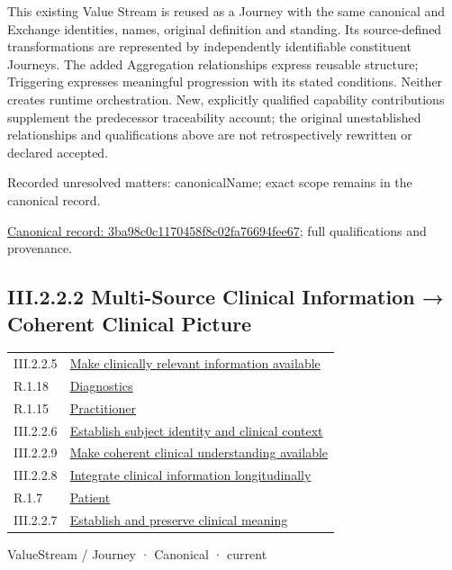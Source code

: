 This existing Value Stream is reused as a Journey with the same canonical and Exchange identities, names, original definition and standing. Its source-defined transformations are represented by independently identifiable constituent Journeys. The added Aggregation relationships express reusable structure; Triggering expresses meaningful progression with its stated conditions. Neither creates runtime orchestration. New, explicitly qualified capability contributions supplement the predecessor traceability account; the original unestablished relationships and qualifications above are not retrospectively rewritten or declared accepted.


{\small Recorded unresolved matters: canonicalName; exact scope remains in the canonical record.}\par
{\footnotesize \href{../../../../continuum/strategy/value-stream/3ba98c0c1170458f8c02fa76694fee67.md}{Canonical record: 3ba98c0c1170458f8c02fa76694fee67}; full qualifications and provenance.}\par
\subsection*{III.2.2.2 Multi-Source Clinical Information → Coherent Clinical Picture}
\label{navigation:III.2.2.2}

\begin{longtable}{p{.22\linewidth}p{.73\linewidth}}
III.2.2.5 & \hyperref[element:2e20e48451b64dafa4fe7eaee2501c7a]{Make clinically relevant information available} \\
R.1.18 & \hyperref[element:46751a4e48a642a8b05831cfe4785007]{Diagnostics} \\
R.1.15 & \hyperref[element:49480591b4554983aaa82a79c1568bf3]{Practitioner} \\
III.2.2.6 & \hyperref[element:667853f4a4c343dcb559584cb08d71cf]{Establish subject identity and clinical context} \\
III.2.2.9 & \hyperref[element:75179fdde77f4c94a47756a7ae109b34]{Make coherent clinical understanding available} \\
III.2.2.8 & \hyperref[element:80b2d41cb7fc4c929cee667353caa411]{Integrate clinical information longitudinally} \\
R.1.7 & \hyperref[element:5f6d333e94634420b8a8bbf8b9cb6e2a]{Patient} \\
III.2.2.7 & \hyperref[element:e64c4ed500d84f0fa84a12646ea8b98d]{Establish and preserve clinical meaning} \\
\end{longtable}
\label{element:01f655eae3d8485699449c3dcf4f9b56}
{\small ValueStream / Journey · Canonical · current}\par

